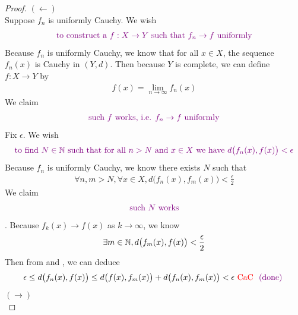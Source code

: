 \documentclass{report}
\begin{document}
\begin{proof}
$(\longleftarrow)$\\

Suppose $f_n$ is uniformly Cauchy. We wish 
\begin{align*}
  \textcolor{violet}{\text{ to construct a $f:X\rightarrow Y$ such that }f_n\to f\text{ uniformly }}
\end{align*}
Because $f_n$ is uniformly Cauchy, we know that for all $x \in X$, the sequence $f_n(x)$ is Cauchy in $(Y,d)$. Then because $Y$ is complete, we can define $f:X\rightarrow Y$ by 
 \begin{align*}
f(x)=\lim_{n\to \infty}f_n(x)
\end{align*}
We claim 
\begin{align*}
\textcolor{violet}{\text{ such $f$ works, i.e.  $f_n\to f$ uniformly }}
\end{align*}
Fix $\epsilon $. We wish 
\begin{align*}
  \textcolor{violet}{\text{ to find $N\in\mathbb{N}$ such that for all $n>N$ and  $x \in X$ we have $d\big(f_n(x),f(x)\big)<\epsilon $ }}
\end{align*}
Because $f_n$ is uniformly Cauchy, we know there exists $N$ such that  
\begin{align}
\label{K5}
\forall n,m>N, \forall x\in X, d\big(f_n(x),f_m(x) \big)<\frac{\epsilon }{2}
\end{align}
We claim 
\begin{align*}
\textcolor{violet}{\text{ such $N$ works }}
\end{align*}
 . Because $f_k(x)\to f(x)$ as $k\to \infty$, we know 
\begin{align}
  \label{K6}
\exists m \in\mathbb{N}, d\big(f_m(x),f(x) \big)<\frac{\epsilon}{2}
\end{align}
Then from  and , we can deduce 
\begin{align*}
\epsilon \leq d\big(f_n(x),f(x)\big)\leq  d\big(f(x),f_m(x)\big)  + d\big(f_n(x),f_m(x)\big)<\epsilon \text{ \textcolor{red}{CaC} } \textcolor{violet}{\text{ (done) }}
 \end{align*}
 $(\longrightarrow)$\\


\end{proof}
\end{document}
